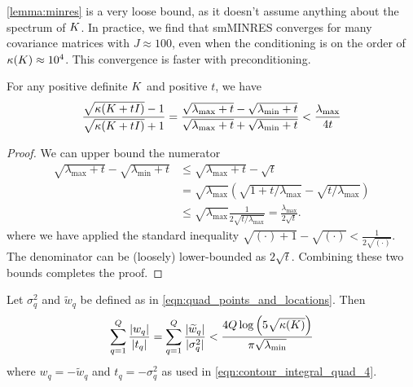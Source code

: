 \cref{lemma:minres} is a very loose bound, as it doesn't assume anything about the spectrum of $K$.
In practice, we find that smMINRES converges for many covariance matrices with $J \approx 100$, even when the conditioning is on the order of $\kappa(K) \approx 10^4$.
This convergence is faster with preconditioning.




\begin{lemma}
  For any positive definite $K$ and positive $t$, we have
  \begin{align}
    \frac{
      \sqrt{\kappa(K + t I)} - 1
    }{
      \sqrt{\kappa(K + t I)} + 1
    } = \frac{\sqrt{\lambda_\text{max} + t} - \sqrt{\lambda_\text{min} + t}  }{\sqrt{\lambda_\text{max} + t} + \sqrt{\lambda_\text{min} + t}  }
    < \frac{\lambda_\text{max}}{4t}
  \end{align}
  \label{lemma:condition}
\end{lemma}

\begin{proof}
  We can upper bound the numerator
  \begin{align*}
    \sqrt{\lambda_\text{max} + t} - \sqrt{\lambda_\text{min} + t}
    &\leq
    \sqrt{\lambda_\text{max} + t} - \sqrt{t}
    \\
    &=
    \sqrt{\lambda_\text{max}} \left( \sqrt{1 + t/\lambda_\text{max}} - \sqrt{t/\lambda_\text{max}} \right)
    \\
    &\leq
    \sqrt{\lambda_\text{max}} \frac{1}{2 \sqrt{t/\lambda_\text{max}}}
    =
    \frac{\lambda_\text{max}}{2 \sqrt{t}}.
  \end{align*}
  where we have applied the standard inequality $\sqrt{(\cdot)+1} - \sqrt{(\cdot)} < \frac{1}{2 \sqrt{(\cdot)}}$.
  The denominator can be (loosely) lower-bounded as $2\sqrt{t}$.
  Combining these two bounds completes the proof.
\end{proof}




\begin{lemma}
  Let $\sigma_q^2$ and $\widetilde w_q$ be defined as in \cref{eqn:quad_points_and_locations}.
  Then
  \begin{equation*}
    \sum_{q=1}^Q \frac{|w_q|}{|t_q|} = \sum_{q=1}^Q \frac{|\widetilde w_q|}{|\sigma^2_q|} < \frac{4 Q \log \left( 5 \sqrt{\kappa(K)} \right)  }{\pi \sqrt{\lambda_\text{min}}} \\
  \end{equation*}
  where $w_q = -\widetilde w_q$ and $t_q = -\sigma^2_q$ as used in \cref{eqn:contour_integral_quad_4}.
  \label{lemma:quad_ratio}
\end{lemma}

